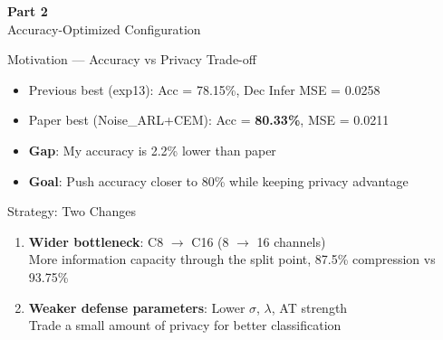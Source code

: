 \documentclass[aspectratio=169, 10pt]{beamer}
\begin{document}
\begin{frame}{}
\vfill
\begin{center}
{\Huge\textbf{Part 2}}\\[0.3cm]
{\Large Accuracy-Optimized Configuration}
\end{center}
\vfill
\end{frame}

\begin{frame}{Motivation --- Accuracy vs Privacy Trade-off}

\begin{itemize}\setlength{\itemsep}{6pt}
    \item Previous best (exp13): Acc = 78.15\%, Dec Infer MSE = 0.0258
    \item Paper best (Noise\_ARL+CEM): Acc = \textbf{80.33\%}, MSE = 0.0211
    \item \textbf{Gap}: My accuracy is 2.2\% lower than paper
    \item \textbf{Goal}: Push accuracy closer to 80\% while keeping privacy advantage
\end{itemize}

\vspace{0.3cm}

\begin{block}{Strategy: Two Changes}
\begin{enumerate}\setlength{\itemsep}{4pt}
    \item \textbf{Wider bottleneck}: C8 $\to$ C16 (8 $\to$ 16 channels)\\
    {\small More information capacity through the split point, 87.5\% compression vs 93.75\%}
    \item \textbf{Weaker defense parameters}: Lower $\sigma$, $\lambda$, AT strength\\
    {\small Trade a small amount of privacy for better classification}
\end{enumerate}
\end{block}

\end{frame}
\end{document}

